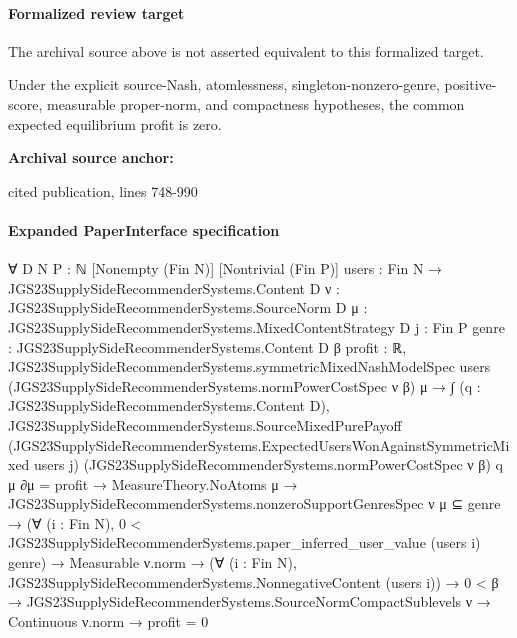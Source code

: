 \documentclass[10pt]{article}
\begin{document}
\paragraph{Formalized review target}
The archival source above is not asserted equivalent to this formalized target.
\begin{ReviewVerbatim}
Under the explicit source-Nash, atomlessness, singleton-nonzero-genre, positive-score, measurable proper-norm, and compactness hypotheses, the common expected equilibrium profit is zero.
\end{ReviewVerbatim}

\textbf{Archival source anchor:} {\footnotesize\raggedright cited publication, lines 748-\allowbreak{}990\par}
\paragraph{Expanded PaperInterface specification}
\begin{ReviewVerbatim}
∀ {D N P : ℕ} [Nonempty (Fin N)] [Nontrivial (Fin P)] {users : Fin N → JGS23SupplySideRecommenderSystems.Content D}
  {ν : JGS23SupplySideRecommenderSystems.SourceNorm D} {μ : JGS23SupplySideRecommenderSystems.MixedContentStrategy D}
  {j : Fin P} {genre : JGS23SupplySideRecommenderSystems.Content D} {β profit : ℝ},
  JGS23SupplySideRecommenderSystems.symmetricMixedNashModelSpec users
      (JGS23SupplySideRecommenderSystems.normPowerCostSpec ν β) μ →
    ∫ (q : JGS23SupplySideRecommenderSystems.Content D),
          JGS23SupplySideRecommenderSystems.SourceMixedPurePayoff
            (JGS23SupplySideRecommenderSystems.ExpectedUsersWonAgainstSymmetricMixed users j)
            (JGS23SupplySideRecommenderSystems.normPowerCostSpec ν β) q μ ∂μ =
        profit →
      MeasureTheory.NoAtoms μ →
        JGS23SupplySideRecommenderSystems.nonzeroSupportGenresSpec ν μ ⊆ {genre} →
          (∀ (i : Fin N), 0 < JGS23SupplySideRecommenderSystems.paper_inferred_user_value (users i) genre) →
            Measurable ν.norm →
              (∀ (i : Fin N), JGS23SupplySideRecommenderSystems.NonnegativeContent (users i)) →
                0 < β → JGS23SupplySideRecommenderSystems.SourceNormCompactSublevels ν → Continuous ν.norm → profit = 0
\end{ReviewVerbatim}
\end{document}
